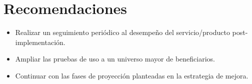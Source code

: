\section{Recomendaciones}
\label{sec:recomendaciones}
\begin{itemize}
    \item Realizar un seguimiento periódico al desempeño del servicio/producto post-implementación.
    \item Ampliar las pruebas de uso a un universo mayor de beneficiarios.
    \item Continuar con las fases de proyección planteadas en la estrategia de mejora.
\end{itemize}
